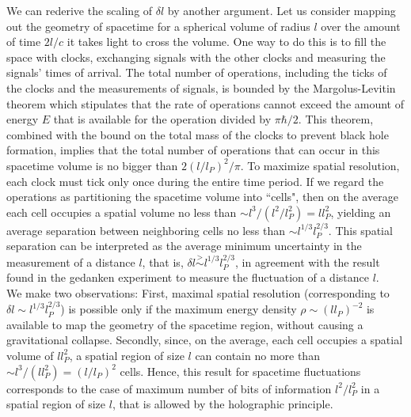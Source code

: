 \documentclass[a4paper]{jpconf}
\begin{document}
We can rederive the scaling of $\delta l$ by another argument. 
Let us consider mapping
out the geometry of spacetime for a spherical volume of radius $l$ over the
amount of time $2l/c$ it takes light to cross the volume.\cite{llo04} One way to 
do this is to fill the space with clocks, exchanging
signals with the other clocks and measuring the signals' times of arrival. The 
total number of operations, including the ticks of the clocks and
the measurements of signals, is bounded by the Margolus-Levitin
theorem \cite{mar98}
which stipulates that the rate of operations cannot exceed the amount of energy 
$E$ that is available for the operation divided by $\pi \hbar/2$.  This theorem, 
combined with the
bound on the total mass of the clocks to prevent black hole formation, implies 
that the total number of operations that can occur in this spacetime volume is 
no bigger than $2 (l/l_P)^2 / \pi$.  To maximize spatial resolution,
each clock must tick
only once during the entire time period.  If we regard the operations
as partitioning the spacetime volume into ``cells", then on the average each 
cell
occupies a spatial volume no less than $\sim l^3 / (l^2 / l_P^2)
= l l_P^2$, yielding an average separation between neighboring
cells no less than $ \sim l^{1/3} l_P^{2/3}$.
\cite{ng08}  This spatial separation can be interpreted as the average minimum 
uncertainty in the
measurement of a distance $l$, that is, $\delta l \stackrel{>}{\sim} l^{1/3}
l_P^{2/3}$, 
in agreement with the result found in the gedanken 
experiment to measure the fluctuation of a distance $l$.\\

We make two observations: \cite{Arzano,plb} First, maximal
spatial resolution (corresponding to  $\delta l \sim l^{1/3}
l_P^{2/3}$)
is possible only if the maximum energy density $\rho \sim (l l_P)^{-2}$
is available to map the geometry
of the spacetime region, without causing a gravitational collapse.
Secondly,
since, on the average, each cell occupies a spatial volume of $l l_P^2$,
a spatial region of size $l$ can contain no more than $\sim l^3/(l l_P^2) = 
(l/l_P)^2$ cells.
Hence, this result for spacetime fluctuations 
corresponds to the case of
maximum number of bits of information $l^2 /l_P^2$
in a spatial region of size $l$, that is
allowed by the holographic principle\cite{holography,Susskind}.\\
\end{document}
